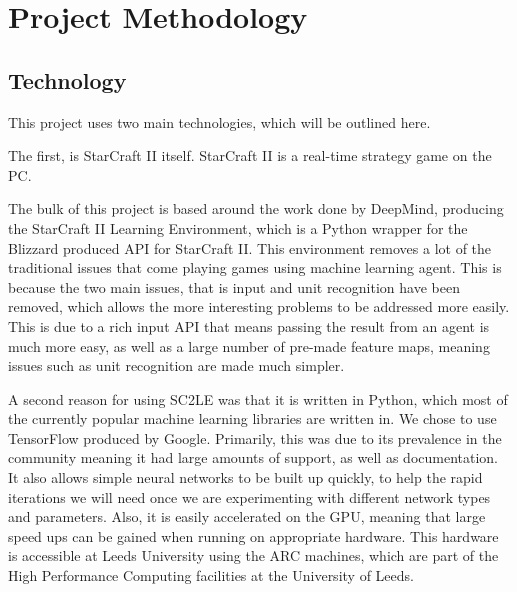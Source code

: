 \chapter{Project Methodology}%
\label{method}

\section{Technology}

This project uses two main technologies, which will be outlined here.

The first, is StarCraft II itself. StarCraft II is a real-time strategy game on
the PC\@. %

The bulk of this project is based around the work done by DeepMind, producing
the StarCraft II Learning Environment, which is a Python\cite{python-website}
wrapper for the Blizzard produced API for StarCraft II\cite{bliz-api}. This
environment removes a lot of the traditional issues that come playing
games using machine learning agent. This is because the two main issues, that
is input and unit recognition have been removed, which allows the more interesting
problems to be addressed more easily. This is due to a rich input API that means
passing the result from an agent is much more easy, as well as a large number
of pre-made feature maps, meaning issues such as unit recognition are made much
simpler.


A second reason for using SC2LE was that it is written in Python, which most
of the currently popular machine learning libraries are written in. We chose to
use TensorFlow\cite{tensorflow2015-whitepaper} produced by Google. Primarily,
this was due to its prevalence in the community meaning it had large amounts of
support, as well as documentation. It also allows simple neural networks to be
built up quickly, to help the rapid iterations we will need once we are experimenting
with different network types and parameters. Also, it is easily accelerated on the
GPU, meaning that large speed ups can be gained when running on appropriate hardware.
This hardware is accessible at Leeds University using the ARC machines, which are
part of the High Performance Computing facilities at the University
of Leeds\cite{arc}.

